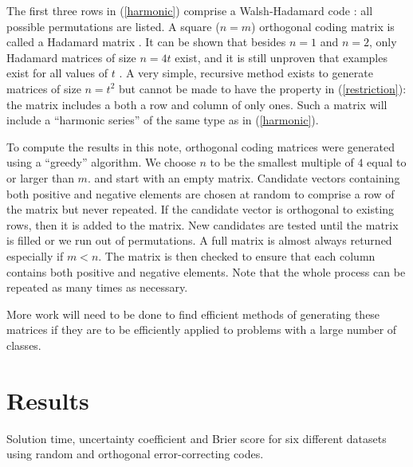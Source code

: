 The first three rows in (\ref{harmonic}) comprise a Walsh-Hadamard code \citep{Arora_Barak2009}:
all possible permutations are listed.
A square ($n=m$) orthogonal coding matrix is called a Hadamard matrix
\citep{Sylvester1867}.
It can be shown that besides $n=1$ and $n=2$, only Hadamard matrices of size
$n=4t$ exist,  
and it is still unproven that examples exist for all values of $t$
\citep{Hedayat_Wallis1978}.
A very simple, recursive method exists to generate matrices of size $n=t^2$ 
\citep{Hedayat_Wallis1978} but cannot be made to have the property in (\ref{restriction}): 
the matrix includes a both a row and column of only ones.
Such a matrix will include a ``harmonic series'' of the same type as in
(\ref{harmonic}).


To compute the results in this note, orthogonal coding matrices were generated
using a ``greedy'' algorithm.
We choose $n$ to be the smallest multiple of $4$ equal to or larger than $m$.
and start with an empty matrix.
Candidate vectors containing both positive and negative elements 
are chosen at random to comprise a row of the matrix but never repeated.
If the candidate vector is orthogonal to existing rows, then it is added to the matrix.
New candidates are tested until the matrix is filled or we run out of permutations.
A full matrix is almost always returned especially if $m<n$.
The matrix is then checked to ensure that 
each column contains both positive and negative elements.
Note that the whole process can be repeated as many times as necessary.

More work will need to be done to find efficient methods
of generating these matrices
if they are to be efficiently applied to problems with a large number of classes.


\section{Results}

\begin{table*}
\caption{Solution time, uncertainty coefficient and Brier score for six different datasets using random and orthogonal error-correcting codes.}\label{class_results}

\end{table*}

